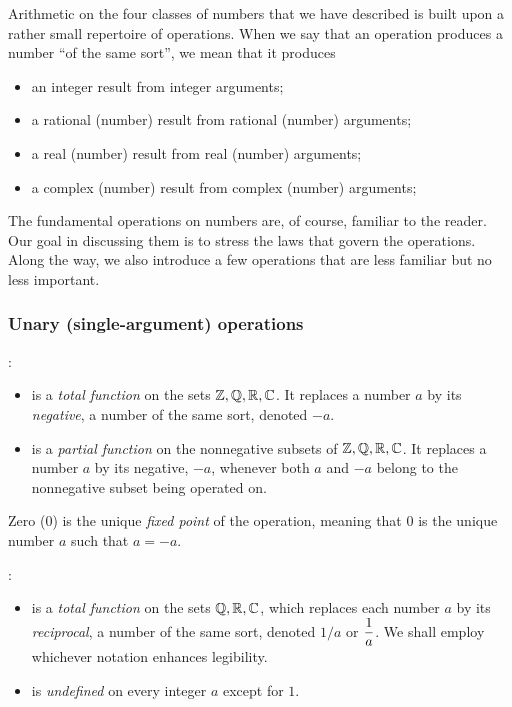 \smallskip

%
Arithmetic on the four classes of numbers that we have described is
built upon a rather small repertoire of operations.  When we say that
an operation produces a number ``of the same sort'', we mean that it
produces
\begin{itemize}
\item
an integer result from integer arguments;
\item
a rational (number) result from rational (number) arguments;
\item
a real (number) result from real (number) arguments;
\item
a complex (number) result from complex (number) arguments;
\end{itemize}
The fundamental operations on numbers are, of course, familiar to the
reader.  Our goal in discussing them is to stress the laws that govern
the operations.  Along the way, we also introduce a few operations
that are less familiar but no less important.

\subsubsection{Unary (single-argument) operations}

%
:
\begin{itemize}
\item
is a {\em total function} on the sets $\mathbb{Z}, \mathbb{Q}, \mathbb{R}, \mathbb{C}$.  It replaces
a number $a$ by its {\em negative},
a number of the same sort, denoted $-a$.
\item
is a {\em partial function} on the nonnegative subsets
of $\mathbb{Z}, \mathbb{Q}, \mathbb{R}, \mathbb{C}$.  It replaces a number $a$ by its negative, $-a$,
whenever both $a$ and $-a$ belong to the nonnegative subset being
operated on.
\end{itemize}
Zero ($0$) is the unique {\it fixed point} of the operation,
meaning that $0$ is the unique number $a$ such that $a = -a$.

\medskip

:
\begin{itemize}
\item
{}
is a {\em total function} on the sets $\mathbb{Q}, \mathbb{R}, \mathbb{C}$, which replaces each
number $a$ by its {\em reciprocal}, 
a number of the same sort, denoted $1/a$ or $\displaystyle {1 \over
  a}$.  We shall employ whichever notation enhances legibility.

\item
is {\em undefined} on every integer $a$ except for $1$.
\end{itemize}

